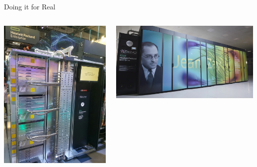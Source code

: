 \begin{frame}[label=bragging]{Doing it for Real}
  \begin{columns}
    \begin{column}[T]{3.5cm}
      \includegraphics[height=0.6\textheight]{pictures/jean-zay.jpg}
    \end{column}
    \begin{column}[T]{6cm}
      \includegraphics[width=\textwidth]{pictures/jean_Zay.jpg}
    \end{column}
  \end{columns}
  

\end{frame}
